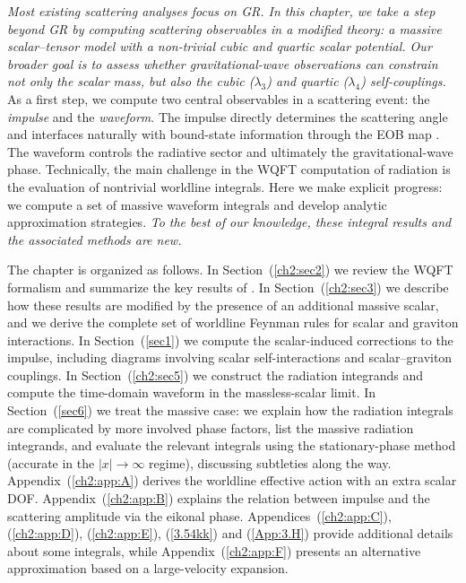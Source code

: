 \textit{Most existing scattering analyses focus on GR. In this chapter, we take a step beyond GR by computing scattering observables in a modified theory: a massive scalar--tensor model with a non-trivial cubic and quartic scalar potential. Our broader goal is to assess whether gravitational-wave observations can constrain not only the scalar mass, but also the cubic ($\lambda_3$) and quartic ($\lambda_4$) self-couplings.} As a first step, we compute two central observables in a scattering event: the \emph{impulse} and the \emph{waveform}. The impulse directly determines the scattering angle and interfaces naturally with bound-state information through the EOB map \cite{Buonanno:1998gg}. The waveform controls the radiative sector and ultimately the gravitational-wave phase. Technically, the main challenge in the WQFT computation of radiation is the evaluation of nontrivial worldline integrals. Here we make explicit progress: we compute a set of massive waveform integrals and develop analytic approximation strategies. \textit{To the best of our knowledge, these integral results and the associated methods are new.}

The chapter is organized as follows. In Section~(\ref{ch2:sec2}) we review the WQFT formalism and summarize the key results of \cite{Mogull:2020sak}. In Section~(\ref{ch2:sec3}) we describe how these results are modified by the presence of an additional massive scalar, and we derive the complete set of worldline Feynman rules for scalar and graviton interactions. In Section~(\ref{sec1}) we compute the scalar-induced corrections to the impulse, including diagrams involving scalar self-interactions and scalar--graviton couplings. In Section~(\ref{ch2:sec5}) we construct the radiation integrands and compute the time-domain waveform in the massless-scalar limit. In Section~(\ref{sec6}) we treat the massive case: we explain how the radiation integrals are complicated by more involved phase factors, list the massive radiation integrands, and evaluate the relevant integrals using the stationary-phase method (accurate in the $|x|\to\infty$ regime), discussing subtleties along the way. Appendix~(\ref{ch2:app:A}) derives the worldline effective action with an extra scalar DOF. Appendix~(\ref{ch2:app:B}) explains the relation between impulse and the scattering amplitude via the eikonal phase. Appendices~(\ref{ch2:app:C}), (\ref{ch2:app:D}), (\ref{ch2:app:E}), (\ref{3.54kk}) and (\ref{App:3.H}) provide additional details about some integrals, while Appendix~(\ref{ch2:app:F}) presents an alternative approximation based on a large-velocity expansion. 
